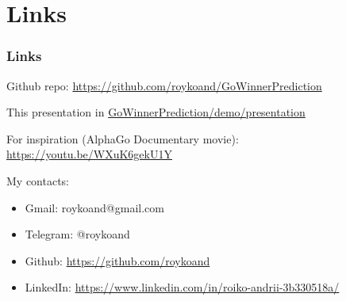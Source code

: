 \documentclass{beamer}
\begin{document}
\section{Links}
\begin{frame}
\frametitle{Links}

Github repo: \url{https://github.com/roykoand/GoWinnerPrediction}

This presentation in \url{GoWinnerPrediction/demo/presentation}

For inspiration (AlphaGo Documentary movie): \url{https://youtu.be/WXuK6gekU1Y}
\end{frame}



\begin{frame}
My contacts:
\begin{itemize}
\frametitle{The end :)}

\item Gmail: roykoand@gmail.com
\item Telegram: @roykoand
\item Github: \url{https://github.com/roykoand}
\item LinkedIn: \url{https://www.linkedin.com/in/roiko-andrii-3b330518a/}

\end{itemize}
\end{frame}

\end{document}
